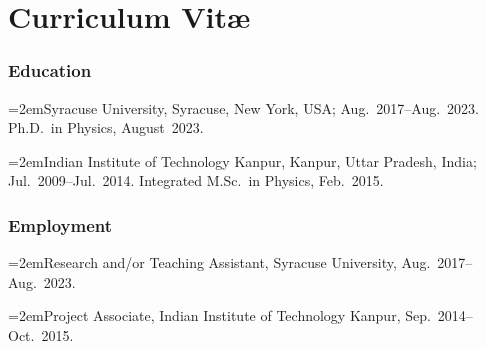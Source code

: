 
\chapter*{Curriculum Vit\ae}
\thispagestyle{empty}

\def\hangpar{\noindent\hangindent=2em}

\subsection*{Education}

\hangpar Syracuse University, Syracuse, New York, USA; Aug.~2017--Aug.~2023.\\
Ph.D.~in Physics, August~2023.

\hangpar Indian Institute of Technology Kanpur, Kanpur, Uttar Pradesh, India; Jul.~2009--Jul.~2014. Integrated M.Sc.~in Physics, Feb.~2015.

\subsection*{Employment}

\hangpar Research and/or Teaching Assistant, Syracuse University, Aug.~2017--Aug.~2023.

\hangpar Project Associate, Indian Institute of Technology Kanpur, Sep.~2014--Oct.~2015.


